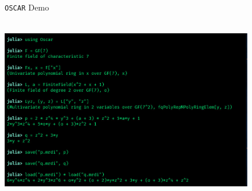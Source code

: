 \documentclass[9pt]{beamer}
\newcommand\oscar{\texttt{OSCAR}\xspace}
\theoremstyle{definition}
\begin{document}
\begin{frame}[fragile]{\oscar Demo}
  \begin{center}
    \includegraphics[height=8cm, width=11cm]{images/demo}
  \end{center}
\end{frame}

\end{document}
